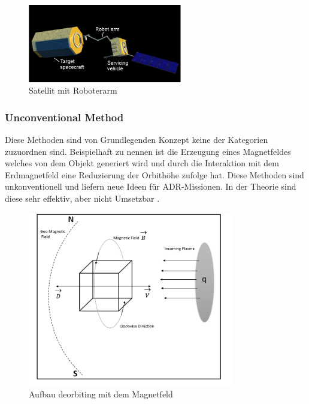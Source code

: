 	\begin{figure}[h]
			\centering
					\includegraphics[width=0.60\textwidth]{./graphics/ADR/Sattelit_Methode.PNG}
				\caption{Satellit mit Roboterarm \cite{Nishida.2011}}
				\label{fig:Satellit}
			\end{figure}
			
	
\subsubsection{Unconventional	Method}
	
	Diese Methoden sind von Grundlegenden Konzept keine der Kategorien zuzuordnen sind. Beispielhaft zu nennen ist die Erzeugung eines Magnetfeldes welches von dem Objekt generiert wird und durch die Interaktion mit dem Erdmagnetfeld eine Reduzierung der Orbithöhe zufolge hat. Diese Methoden sind unkonventionell und liefern neue Ideen für ADR-Missionen. In der Theorie sind diese sehr effektiv, aber nicht Umsetzbar \cite{Mark.2019}.

	\begin{figure}[h]
			\centering
					\includegraphics[width=0.80\textwidth]{./graphics/ADR/Magnet.PNG}
				\caption{Aufbau deorbiting mit dem Magnetfeld \cite{Chopra.05282018}}
				\label{fig:Magnet}
			\end{figure}
			

